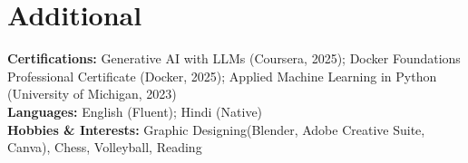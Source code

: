 \documentclass[letterpaper,11pt]{article}
\begin{document}
\section{Additional}
 \begin{itemize}[leftmargin=0.15in, label={}]
    \small{\item{
        \textbf{Certifications:} Generative AI with LLMs (Coursera, 2025); Docker Foundations Professional Certificate (Docker, 2025); Applied Machine Learning in Python (University of Michigan, 2023) \\
        
        \textbf{Languages:} English (Fluent); Hindi (Native) \\
        
        \textbf{Hobbies \& Interests:} Graphic Designing(Blender, Adobe Creative Suite, Canva), Chess, Volleyball, Reading  \\
    }}
 \end{itemize}
\end{document}
